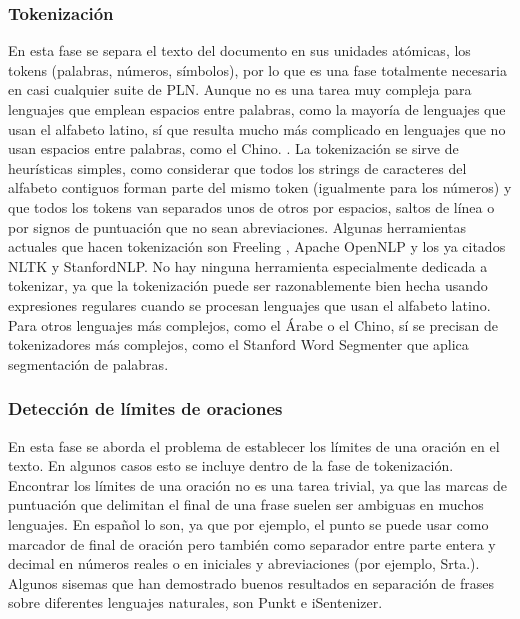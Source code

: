 \subsubsection{Tokenización}
En esta fase se separa el texto del documento en sus unidades atómicas, los tokens (palabras, números, símbolos), por lo que es una fase totalmente necesaria en casi cualquier suite de PLN. Aunque no es una tarea muy compleja para lenguajes que emplean espacios entre palabras, como la mayoría de lenguajes que usan el alfabeto latino, sí que resulta mucho más complicado en lenguajes que no usan espacios entre palabras, como el Chino. \citet{chang2008optimizing}. \newline
La tokenización se sirve de heurísticas simples, como considerar que todos los strings de caracteres del alfabeto contiguos forman parte del mismo token (igualmente para los números) y que todos los tokens van separados unos de otros por espacios, saltos de línea o por signos de puntuación que no sean abreviaciones. Algunas herramientas actuales que hacen tokenización son \textsf{Freeling} \citet{padro2012freeling}, \textsf{Apache OpenNLP} \citet{baldridge2005opennlp} y los ya citados \textsf{NLTK} y \textsf{StanfordNLP}. No hay ninguna herramienta especialmente dedicada a tokenizar, ya que la tokenización puede ser razonablemente bien hecha usando expresiones regulares cuando se procesan lenguajes que usan el alfabeto latino. Para otros lenguajes más complejos, como el Árabe o el Chino, sí se precisan de tokenizadores más complejos, como el \textsf{Stanford Word Segmenter} que aplica segmentación de palabras. 
\subsubsection{Detección de límites de oraciones}
En esta fase se aborda el problema de establecer los límites de una oración en el texto. En algunos casos esto se incluye dentro de la fase de tokenización. Encontrar los límites de una oración no es una tarea trivial, ya que las marcas de puntuación que delimitan el final de una frase suelen ser ambiguas en muchos lenguajes. En español lo son, ya que por ejemplo, el punto se puede usar como marcador de final de oración pero también como separador entre parte entera y decimal en números reales o en iniciales y abreviaciones (por ejemplo, Srta.). \newline
Algunos sisemas que han demostrado buenos resultados en separación de frases sobre diferentes lenguajes naturales, son \textsf{Punkt} \citet{kiss2006unsupervised} e \textsf{iSentenizer}\citet{wong2014isentenizer}.  
